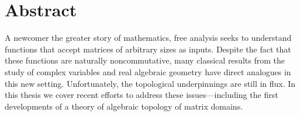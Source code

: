 \begingroup
\let\clearpage\relax
\let\cleardoublepage\relax
\let\cleardoublepage\relax

\chapter*{Abstract}
A newcomer the greater story of mathematics, free analysis seeks to understand
functions that accept matrices of arbitrary sizes as inputs. Despite the fact
that these functions are naturally noncommutative, many classical results from
the study of complex variables and real algebraic geometry have direct analogues
in this new setting. Unfortunately, the topological underpinnings are still in
flux. In this thesis we cover recent efforts to address these issues---including
the first developments of a theory of algebraic topology of matrix domains.



\vfill
\endgroup

\vfill
